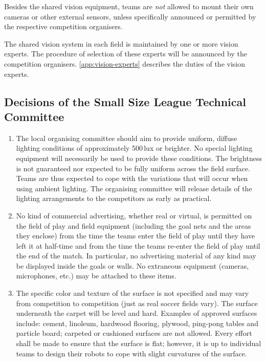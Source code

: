 Besides the shared vision equipment, teams are \emph{not} allowed to mount
their own cameras or other external sensors, unless specifically announced or
permitted by the respective competition organisers.

The shared vision system in each field is maintained by one or more vision
experts. The procedure of selection of these experts will be announced by the
competition organisers. \autoref{app:vision-experts} describes the duties of the
vision experts.

\subsection*{Decisions of the Small Size League Technical Committee}
\begin{enumerate}
\item
The local organising committee should aim to provide uniform, diffuse lighting
conditions of approximately 500\,lux or brighter. No special lighting equipment
will necessarily be used to provide these conditions. The brightness is not
guaranteed nor expected to be fully uniform across the field surface. Teams are
thus expected to cope with the variations that will occur when using ambient
lighting. The organising committee will release details of the lighting
arrangements to the competitors as early as practical.

\item
No kind of commercial advertising, whether real or virtual, is permitted on the
field of play and field equipment (including the goal nets and the areas they
enclose) from the time the teams enter the field of play until they have left it
at half-time and from the time the teams re-enter the field of play until the
end of the match. In particular, no advertising material of any kind may be
displayed inside the goals or walls. No extraneous equipment (cameras,
microphones, etc.) may be attached to these items.

\item
The specific color and texture of the surface is not specified and may vary
from competition to competition (just as real soccer fields vary).
The surface underneath the carpet will be level and hard.
Examples of approved surfaces include: cement, linoleum, hardwood flooring,
plywood, ping-pong tables and particle board; carpeted or cushioned surfaces are
not allowed. Every effort shall be made to ensure that the surface is flat;
however, it is up to individual teams to design their robots to cope with slight
curvatures of the surface.
\end{enumerate}
